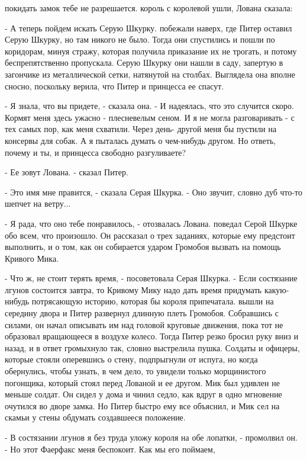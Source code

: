 покидать замок тебе не разрешается.
 король с королевой ушли, Лована сказала:
\par- А теперь пойдем искать Серую Шкурку.
 побежали наверх, где Питер оставил Серую Шкурку, но там никого 
не было. Тогда они спустились и пошли по коридорам, минуя стражу, 
которая получила приказание их не трогать, и потому беспрепятственно 
пропускала. Серую Шкурку они нашли в саду, запертую в загончике из 
металлической сетки, натянутой на столбах. Выглядела она вполне 
сносно, поскольку верила, что Питер и принцесса ее спасут.
\par- Я знала, что вы придете, - сказала она. - И надеялась, что это 
случится скоро. Кормят меня здесь ужасно - плесневелым сеном. И я не 
могла разговаривать - с тех самых пор, как меня схватили. Через день-
другой меня бы пустили на консервы для собак. А я пыталась думать о 
чем-нибудь другом. Но ответь, почему и ты, и принцесса свободно 
разгуливаете?
\par- Ее зовут Лована. - сказал Питер.
\par- Это имя мне правится, - сказала Серая Шкурка. - Оно звучит, 
словно дуб что-то шепчет на ветру...
\par- Я рада, что оно тебе понравилось, - отозвалась Лована.
 поведал Серой Шкурке обо всем, что произошло. Он рассказал о 
трех заданиях, которые ему предстоит выполнить, и о том, как он 
собирается ударом Громобоя вызвать на помощь Кривого Мика.
\par- Что ж, не стоит терять время, - посоветовала Серая Шкурка. - 
Если состязание лгунов состоится завтра, то Кривому Мику надо дать 
время придумать какую-нибудь потрясающую историю, которая бы короля 
припечатала.
 вышли на середину двора и Питер развернул длинную плеть 
Громобоя. Собравшись с силами, он начал описывать им над головой 
круговые движения, пока тот не образовал вращающееся в воздухе колесо. 
Тогда Питер резко бросил руку вниз и назад, и в ответ громыхнуло так, 
словно выстрелила пушка. Солдаты и офицеры, которые стояли оперевшись 
о стену, подпрыгнули от испуга, но когда обернулись, чтобы узнать, в 
чем дело, то увидели только морщинистого погонщика, который стоял 
перед Лованой и ее другом.
 Мик был удивлен не меньше солдат. Он сидел у дома и чинил 
седло, как вдруг в одно мгновение очутился во дворе замка. Но Питер 
быстро ему все объяснил, и Мик сел на скамьи у стены обдумать 
создавшееся положение.
\par- В состязании лгунов я без труда уложу короля на обе лопатки, - 
промолвил он. - Но этот Фаерфакс меня беспокоит. Как мы его поймаем, 
